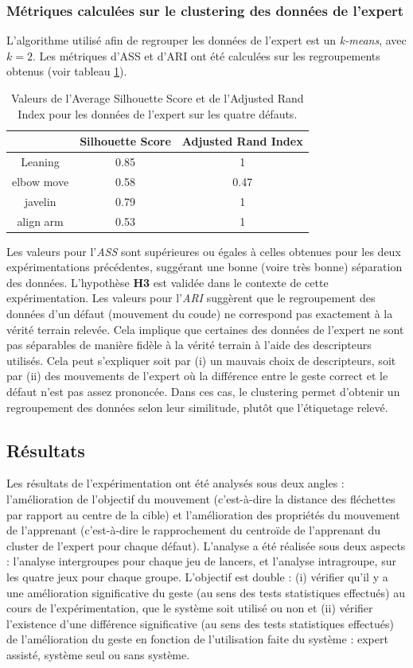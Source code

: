 \subsubsection{Métriques calculées sur le clustering des données de l'expert}
L'algorithme utilisé afin de regrouper les données de l'expert est un \textit{k-means}, avec $k = 2$. Les métriques d'ASS et d'ARI ont été calculées sur les regroupements obtenus (voir tableau \ref{tab:ass_ari_darts}).

\begin{table}[h]
\centering
\begin{tabular}{c|c|c}
& Silhouette Score & Adjusted Rand Index\\\hline
Leaning & 0.85 & 1\\
elbow move & 0.58 & 0.47\\
javelin & 0.79 & 1\\
align arm & 0.53 & 1\\
\end{tabular}
\caption{Valeurs de l'Average Silhouette Score et de l'Adjusted Rand Index pour les données de l'expert sur les quatre défauts.}
\label{tab:ass_ari_darts}
\end{table}

Les valeurs pour l'\textit{ASS} sont supérieures ou égales à celles obtenues pour les deux expérimentations précédentes, suggérant une bonne (voire très bonne) séparation des données. L'hypothèse \textbf{H3} est validée dans le contexte de cette expérimentation. Les valeurs pour l'\textit{ARI} suggèrent que le regroupement des données d'un défaut (mouvement du coude) ne correspond pas exactement à la vérité terrain relevée. Cela implique que certaines des données de l'expert ne sont pas séparables de manière fidèle à la vérité terrain à l'aide des descripteurs utilisés. Cela peut s'expliquer soit par (i) un mauvais choix de descripteurs, soit par (ii) des mouvements de l'expert où la différence entre le geste correct et le défaut n'est pas assez prononcée. Dans ces cas, le clustering permet d'obtenir un regroupement des données selon leur similitude, plutôt que l'étiquetage relevé.

\subsection{Résultats}
Les résultats de l'expérimentation ont été analysés sous deux angles : l'amélioration de l'objectif du mouvement (c'est-à-dire la distance des fléchettes par rapport au centre de la cible) et l'amélioration des propriétés du mouvement de l'apprenant (c'est-à-dire le rapprochement du centroïde de l'apprenant du cluster de l'expert pour chaque défaut). L'analyse a été réalisée sous deux aspects : l'analyse intergroupes pour chaque jeu de lancers, et l'analyse intragroupe, sur les quatre jeux pour chaque groupe. L'objectif est double : (i) vérifier qu'il y a une amélioration significative du geste (au sens des tests statistiques effectués) au cours de l'expérimentation, que le système soit utilisé ou non et (ii) vérifier l'existence d'une différence significative (au sens des tests statistiques effectués) de l'amélioration du geste en fonction de l'utilisation faite du système : expert assisté, système seul ou sans système.

